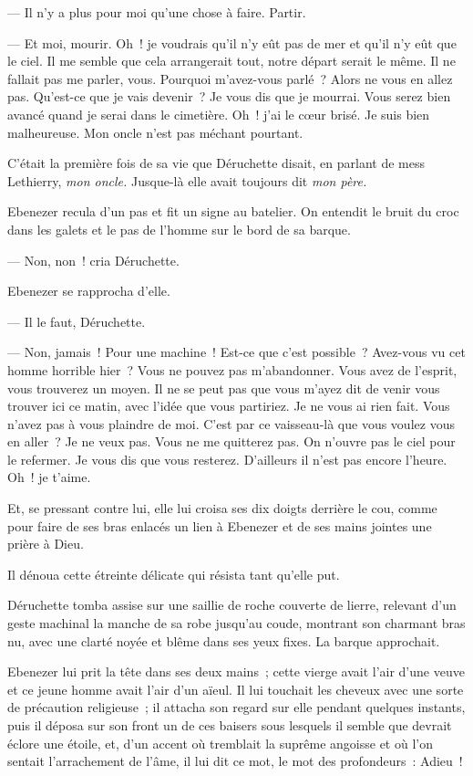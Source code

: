 \documentclass[french,twoside]{book} %
\begin{document}
— Il n’y a plus pour moi qu’une chose à faire. Partir.\par
— Et moi, mourir. Oh ! je voudrais qu’il n’y eût pas de mer et qu’il n’y eût que le ciel. Il me semble que cela arrangerait tout, notre départ serait le même. Il ne fallait pas me parler, vous. Pourquoi m’avez-vous parlé ? Alors ne vous en allez pas. Qu’est-ce que je vais devenir ? Je vous dis que je mourrai. Vous serez bien avancé quand je serai dans le cimetière. Oh ! j’ai le cœur brisé. Je suis bien malheureuse. Mon oncle n’est pas méchant pourtant.\par
C’était la première fois de sa vie que Déruchette disait, en parlant de mess Lethierry, \emph{mon oncle.} Jusque-là elle avait toujours dit \emph{mon père.}\par
Ebenezer recula d’un pas et fit un signe au batelier. On entendit le bruit du croc dans les galets et le pas de l’homme sur le bord de sa barque.\par
— Non, non ! cria Déruchette.\par
Ebenezer se rapprocha d’elle.\par
— Il le faut, Déruchette.\par
— Non, jamais ! Pour une machine ! Est-ce que c’est possible ? Avez-vous vu cet homme horrible hier ? Vous ne pouvez pas m’abandonner. Vous avez de  l’esprit, vous trouverez un moyen. Il ne se peut pas que vous m’ayez dit de venir vous trouver ici ce matin, avec l’idée que vous partiriez. Je ne vous ai rien fait. Vous n’avez pas à vous plaindre de moi. C’est par ce vaisseau-là que vous voulez vous en aller ? Je ne veux pas. Vous ne me quitterez pas. On n’ouvre pas le ciel pour le refermer. Je vous dis que vous resterez. D’ailleurs il n’est pas encore l’heure. Oh ! je t’aime.\par
Et, se pressant contre lui, elle lui croisa ses dix doigts derrière le cou, comme pour faire de ses bras enlacés un lien à Ebenezer et de ses mains jointes une prière à Dieu.\par
Il dénoua cette étreinte délicate qui résista tant qu’elle put.\par
Déruchette tomba assise sur une saillie de roche couverte de lierre, relevant d’un geste machinal la manche de sa robe jusqu’au coude, montrant son charmant bras nu, avec une clarté noyée et blême dans ses yeux fixes. La barque approchait.\par
Ebenezer lui prit la tête dans ses deux mains ; cette vierge avait l’air d’une veuve et ce jeune homme avait l’air d’un aïeul. Il lui touchait les cheveux avec une sorte de précaution religieuse ; il attacha son regard sur elle pendant quelques instants, puis il déposa sur son front un de ces baisers sous lesquels il semble que devrait éclore une étoile, et, d’un accent où tremblait la suprême angoisse et où l’on sentait l’arrachement de l’âme, il lui dit ce mot, le mot des profondeurs : Adieu !\par
\end{document}
